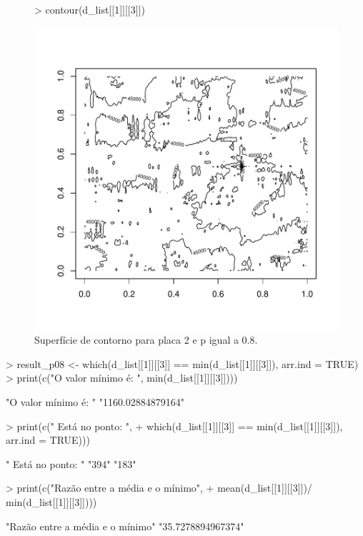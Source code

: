 \documentclass[12pt]{article}
\begin{document}
\begin{figure}
\centering
\begin{Schunk}
\begin{Sinput}
> contour(d_list[[1]][[3]])
\end{Sinput}
\end{Schunk}
\includegraphics{template_matching-023}
\caption{Superfície de contorno para placa 2 e p igual a 0.8.}
\label{placa2p08}
\end{figure}
\begin{Schunk}
\begin{Sinput}
> result_p08 <- which(d_list[[1]][[3]] == min(d_list[[1]][[3]]), arr.ind = TRUE)
> print(c("O valor mínimo é: ",  min(d_list[[1]][[3]])))
\end{Sinput}
\begin{Soutput}
[1] "O valor mínimo é: " "1160.02884879164"  
\end{Soutput}
\begin{Sinput}
> print(c(" Está no ponto: ",
+         which(d_list[[1]][[3]] == min(d_list[[1]][[3]]), arr.ind = TRUE)))
\end{Sinput}
\begin{Soutput}
[1] " Está no ponto: " "394"              "183"             
\end{Soutput}
\begin{Sinput}
> print(c("Razão entre a média e o mínimo", 
+         mean(d_list[[1]][[3]])/ min(d_list[[1]][[3]])))
\end{Sinput}
\begin{Soutput}
[1] "Razão entre a média e o mínimo" "35.7278894967374"              
\end{Soutput}
\end{Schunk}
\end{document}
